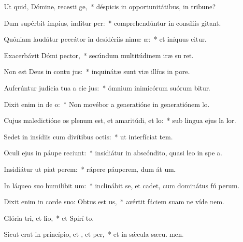 \item Ut quid, Dómine, recesti ge,~* déspicis in opportunitátibus, in tribune?
\item Dum supérbit ímpius, inditur per:~* comprehendúntur in consíliis  gitant.
\item Quóniam laudátur peccátor in desidériis nimæ æ:~* et iníquus citur.
\item Exacerbávit Dómi pector,~* secúndum multitúdinem iræ su  ret.
\item Non est Deus in contu jus:~* inquinátæ sunt viæ illíus in  pore.
\item Auferúntur judícia tua a cie jus:~* ómnium inimicórum suórum bitur.
\item Dixit enim in de o:~* Non movébor a generatióne in generatiónem  lo.
\item Cujus maledictióne os plenum est, et amaritúdi, et lo:~* sub lingua ejus la  lor.
\item Sedet in insídiis cum divítibus  octis:~* ut interfíciat tem.
\item Oculi ejus in páupe reciunt:~* insidiátur in abscóndito, quasi leo in spe a.
\item Insidiátur ut piat perem:~* rápere páuperem, dum át um.
\item In láqueo suo humilibit um:~* inclinábit se, et cadet, cum dominátus fú perum.
\item Dixit enim in corde suo: Obtus est us,~* avértit fáciem suam ne víde  nem.
\item Glória tri, et lio,~* et Spirí to.
\item Sicut erat in princípio, et , et per,~* et in sǽcula sæcu. men.
